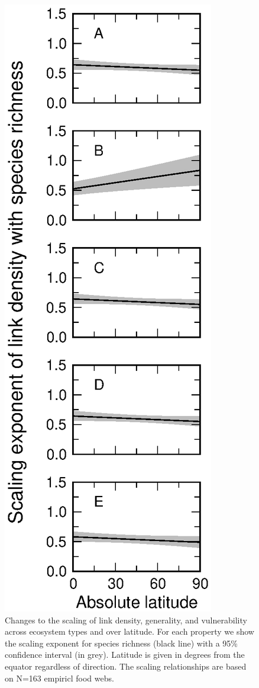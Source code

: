 \documentclass[12pt]{article}
\begin{document}
\begin{figure}[h]
\includegraphics[width=.85\textwidth]{Figures/by_TL/marginal/justS_marginal_latitude.eps}
\caption{Changes to the scaling of link density, generality, and vulnerability across ecosystem
types and over latitude. For each property we show the scaling exponent for species richness (black
line) with a 95\% confidence interval (in grey). Latitude is given in degrees from the equator
regardless of direction. The scaling relationships are based on N=163 empiricl food webs.}
\label{S}
\end{figure}
\end{document}
